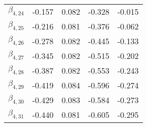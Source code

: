 \begin{tabular}{lrrrr}
$\beta_{4,24}$ & -0.157 &     0.082 &   -0.328 &    -0.015 \\
$\beta_{4,25}$ & -0.216 &     0.081 &   -0.376 &    -0.062 \\
$\beta_{4,26}$ & -0.278 &     0.082 &   -0.445 &    -0.133 \\
$\beta_{4,27}$ & -0.345 &     0.082 &   -0.515 &    -0.202 \\
$\beta_{4,28}$ & -0.387 &     0.082 &   -0.553 &    -0.243 \\
$\beta_{4,29}$ & -0.419 &     0.084 &   -0.596 &    -0.274 \\
$\beta_{4,30}$ & -0.429 &     0.083 &   -0.584 &    -0.273 \\
$\beta_{4,31}$ & -0.440 &     0.081 &   -0.605 &    -0.295 \\
\bottomrule
\end{tabular}
